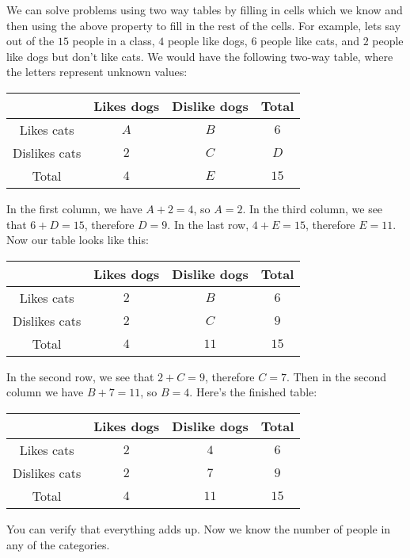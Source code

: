 \documentclass[twocolumn]{article}
\begin{document}
We can solve problems using two way tables by filling in cells which we know and then using the above property to fill in the rest of the cells.
For example, lets say out of the $15$ people in a class, $4$ people like dogs, $6$ people like cats, and $2$ people like dogs but don't like cats.
We would have the following two-way table, where the letters represent unknown values:
\begin{center}
	\begin{tabular}{| c | c | c | c |}
		\hline
                      & Likes dogs & Dislike dogs & Total \\
		\hline
		Likes cats   & $A$        & $B$          & $6$   \\
		\hline
		Dislikes cats & $2$        & $C$          & $D$   \\
		\hline
		Total         & $4$        & $E$          & $15$  \\
		\hline
	\end{tabular}
\end{center}
In the first column, we have $A + 2 = 4$, so $A = 2$.
In the third column, we see that $6 + D = 15$, therefore $D = 9$.
In the last row, $4 + E = 15$, therefore $E = 11$.
Now our table looks like this:
\begin{center}
	\begin{tabular}{| c | c | c | c |}
		\hline
                      & Likes dogs & Dislike dogs & Total \\
		\hline
		Likes cats    & $2$        & $B$          & $6$   \\
		\hline
		Dislikes cats & $2$        & $C$          & $9$   \\
		\hline
		Total         & $4$        & $11$         & $15$  \\
		\hline
	\end{tabular}
\end{center}
In the second row, we see that $2 + C = 9$, therefore $C = 7$.
Then in the second column we have $B + 7 = 11$, so $B = 4$.
Here's the finished table:
\begin{center}
	\begin{tabular}{| c | c | c | c |}
		\hline
                      & Likes dogs & Dislike dogs & Total \\
		\hline
		Likes cats    & $2$        & $4$          & $6$   \\
		\hline
		Dislikes cats & $2$        & $7$          & $9$   \\
		\hline
		Total         & $4$        & $11$         & $15$  \\
		\hline
	\end{tabular}
\end{center}
You can verify that everything adds up.
Now we know the number of people in any of the categories.
\end{document}
